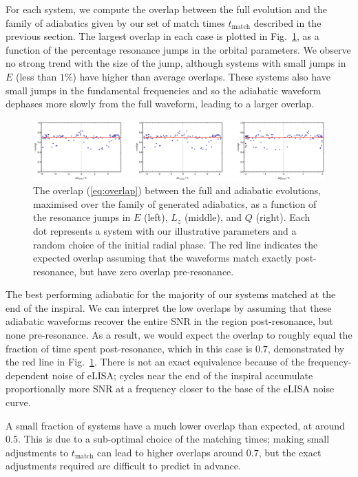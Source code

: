 \documentclass[aps,prd,amsfonts,amssymb,amsmath,nofootinbib,reprint,showpacs,superscriptaddress,twocolumn]{revtex4}
\newcommand{\eqnref}[1]{(\ref{eq:#1})}
\newcommand{\figref}[1]{Fig.\ \ref{fig:#1}}
\begin{document}
For each system, we compute the overlap between the full evolution and the family of adiabatics given by our set of match times $t_\mathrm{match}$ described in the previous section. The largest overlap in each case is plotted in \figref{overlap-vs-resjump-ill}, as a function of the percentage resonance jumps in the orbital parameters. We observe no strong trend with the size of the jump, although systems with small jumps in $E$ (less than $1\%$) have higher than average overlaps. These systems also have small jumps in the fundamental frequencies and so the adiabatic waveform dephases more slowly from the full waveform, leading to a larger overlap.

\begin{figure}[htbp]
\centering
\includegraphics[width=\textwidth]{Fig_overlap_vs_resjump_ill}
\caption{\label{fig:overlap-vs-resjump-ill}The overlap \eqnref{overlap} between the full and adiabatic evolutions, maximised over the family of generated adiabatics, as a function of the resonance jumps in $E$ (left), $L_z$ (middle), and $Q$ (right). Each dot represents a system with our illustrative parameters and a random choice of the initial radial phase. The red line indicates the expected overlap assuming that the waveforms match exactly post-resonance, but have zero overlap pre-resonance.}
\end{figure}

The best performing adiabatic for the majority of our systems matched at the end of the inspiral. We can interpret the low overlaps by assuming that these adiabatic waveforms recover the entire SNR in the region post-resonance, but none pre-resonance. As a result, we would expect the overlap to roughly equal the fraction of time spent post-resonance, which in this case is $0.7$, demonstrated by the red line in \figref{overlap-vs-resjump-ill}. There is not an exact equivalence because of the frequency-dependent noise of eLISA; cycles near the end of the inspiral accumulate proportionally more SNR at a frequency closer to the base of the eLISA noise curve.

A small fraction of systems have a much lower overlap than expected, at around $0.5$. This is due to a sub-optimal choice of the matching times; making small adjustments to $t_\mathrm{match}$ can lead to higher overlaps around $0.7$, but the exact adjustments required are difficult to predict in advance.
\end{document}
